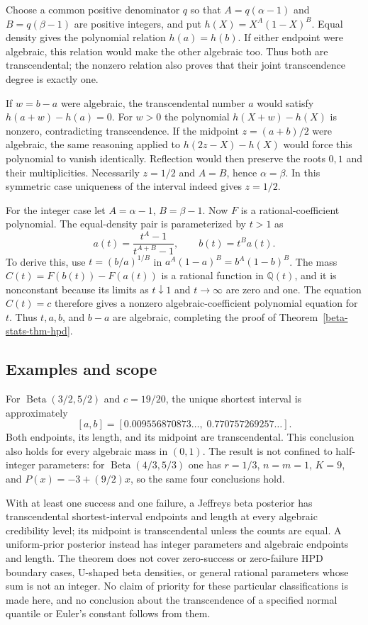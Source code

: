 \documentclass[11pt,a4paper]{article}
\theoremstyle{definition}
\theoremstyle{remark}
\numberwithin{equation}{section}
\begin{document}
Choose a common positive denominator $q$ so that
$A=q(\alpha-1)$ and $B=q(\beta-1)$ are positive integers, and put
$h(X)=X^A(1-X)^B$. Equal density gives the polynomial relation
$h(a)=h(b)$. If either endpoint were algebraic, this relation would
make the other algebraic too. Thus both are transcendental; the
nonzero relation also proves that their joint transcendence degree
is exactly one.

If $w=b-a$ were algebraic, the transcendental number $a$ would
satisfy $h(a+w)-h(a)=0$. For $w>0$ the polynomial
$h(X+w)-h(X)$ is nonzero, contradicting transcendence. If the
midpoint $z=(a+b)/2$ were algebraic, the same reasoning applied to
$h(2z-X)-h(X)$ would force this polynomial to vanish identically.
Reflection would then preserve the roots $0,1$ and their
multiplicities. Necessarily $z=1/2$ and $A=B$, hence
$\alpha=\beta$. In this symmetric case uniqueness of the interval
indeed gives $z=1/2$.

For the integer case let $A=\alpha-1$, $B=\beta-1$. Now $F$ is
a rational-coefficient polynomial. The equal-density pair is
parameterized by $t>1$ as
\[
a(t)=\frac{t^A-1}{t^{A+B}-1},\qquad
b(t)=t^B a(t).
\]
To derive this, use $t=(b/a)^{1/B}$ in
$a^A(1-a)^B=b^A(1-b)^B$. The mass
$C(t)=F(b(t))-F(a(t))$ is a rational function in $\mathbb Q(t)$,
and it is nonconstant because its limits as $t\downarrow1$ and
$t\to\infty$ are zero and one. The equation $C(t)=c$ therefore
gives a nonzero algebraic-coefficient polynomial equation for $t$.
Thus $t,a,b$, and $b-a$ are algebraic, completing the proof of
Theorem~\ref{beta-stats-thm-hpd}.

\subsection{Examples and scope}

For $\operatorname{Beta}(3/2,5/2)$ and $c=19/20$, the unique
shortest interval is approximately
\[
[a,b]=[0.009556870873\ldots,\;0.770757269257\ldots].
\]
Both endpoints, its length, and its midpoint are transcendental.
This conclusion also holds for every algebraic mass in $(0,1)$.
The result is not confined to half-integer parameters: for
$\operatorname{Beta}(4/3,5/3)$ one has $r=1/3$, $n=m=1$,
$K=9$, and $P(x)=-3+(9/2)x$, so the same four conclusions hold.

With at least one success and one failure, a Jeffreys beta posterior
has transcendental shortest-interval endpoints and length at every
algebraic credibility level; its midpoint is transcendental unless
the counts are equal. A uniform-prior posterior instead has integer
parameters and algebraic endpoints and length. The theorem does
not cover zero-success or zero-failure HPD boundary cases,
U-shaped beta densities, or general rational parameters whose sum
is not an integer. No claim of priority for these particular
classifications is made here, and no conclusion about the
transcendence of a specified normal quantile or Euler's constant
follows from them.
\end{document}
